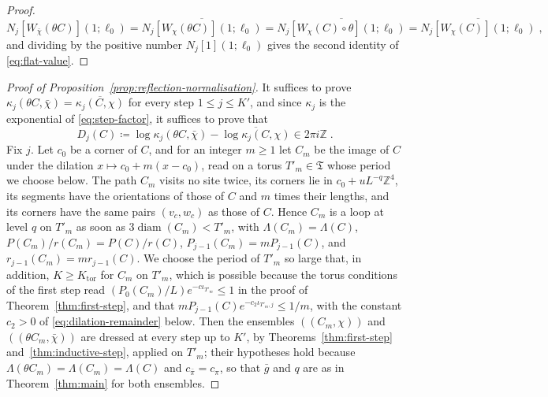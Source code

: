 \documentclass[11pt]{preprint}
\newcommand{\diam}{\operatorname{diam}}
\numberwithin{equation}{section}
\theoremstyle{definition}
\theoremstyle{remark}
\theoremstyle{plain}
\begin{document}
\begin{proof}
\begin{equation}\label{eq:flat-value-symmetry}
    N_j[W_{\bar\chi}(\theta C)](1; \ell_0) = \overline{N_j[W_\chi(\theta C)](1; \ell_0)} = \overline{N_j[W_\chi(C) \circ \theta](1; \ell_0)} = \overline{N_j[W_\chi(C)](1; \ell_0)}\;,
\end{equation}
and dividing by the positive number $N_j[1](1; \ell_0)$ gives the second identity of \eqref{eq:flat-value}.
\end{proof}

\begin{proof}[Proof of Proposition~\ref{prop:reflection-normalisation}]
It suffices to prove $\kappa_j(\theta C, \bar\chi) = \overline{\kappa_j(C, \chi)}$ for every step $1 \leq j \leq K'$, and since $\kappa_j$ is the exponential of \eqref{eq:step-factor}, it suffices to prove that
\begin{equation}\label{eq:log-defect}
    D_j(C) \coloneqq \log\kappa_j(\theta C, \bar\chi) - \overline{\log\kappa_j(C, \chi)} \in 2\pi i\mathbb Z\;.
\end{equation}
Fix $j$. Let $c_0$ be a corner of $C$, and for an integer $m \geq 1$ let $C_m$ be the image of $C$ under the dilation $x \mapsto c_0 + m(x - c_0)$, read on a torus $T'_m \in \mathfrak T$ whose period we choose below. The path $C_m$ visits no site twice, its corners lie in $c_0 + uL^{-q}\mathbb Z^4$, its segments have the orientations of those of $C$ and $m$ times their lengths, and its corners have the same pairs $(v_c, w_c)$ as those of $C$. Hence $C_m$ is a loop at level $q$ on $T'_m$ as soon as $3\diam(C_m) < T'_m$, with $\Lambda(C_m) = \Lambda(C)$, $P(C_m)/r(C_m) = P(C)/r(C)$, $P_{j-1}(C_m) = mP_{j-1}(C)$, and $r_{j-1}(C_m) = mr_{j-1}(C)$. We choose the period of $T'_m$ so large that, in addition, $K \geq K_{\mathrm{tor}}$ for $C_m$ on $T'_m$, which is possible because the torus conditions of the first step read $(P_0(C_m)/L)e^{-c\iota_{T'_m}} \leq 1$ in the proof of Theorem~\ref{thm:first-step}, and that $mP_{j-1}(C)e^{-c_2\iota_{T'_m,j}} \leq 1/m$, with the constant $c_2 > 0$ of \eqref{eq:dilation-remainder} below. Then the ensembles $((C_m, \chi))$ and $((\theta C_m, \bar\chi))$ are dressed at every step up to $K'$, by Theorems~\ref{thm:first-step} and~\ref{thm:inductive-step}, applied on $T'_m$; their hypotheses hold because $\Lambda(\theta C_m) = \Lambda(C_m) = \Lambda(C)$ and $c_{\bar\pi} = c_\pi$, so that $\bar g$ and $q$ are as in Theorem~\ref{thm:main} for both ensembles.


\end{proof}
\end{document}
